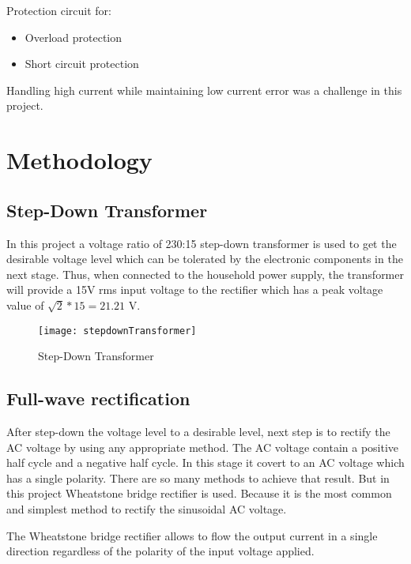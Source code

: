 \documentclass[11pt,a4paper]{article}
\begin{document}
\begin{multicols}{2}
\begin{flushleft}
Protection circuit for:
\end{flushleft}
\vspace{-0.35in}
\begin{itemize}
  \item Overload protection \vspace{-0.1in}
  \item Short circuit protection
\end{itemize}
Handling high current while maintaining low current error was a challenge in this project.

\vspace{0.5in}
\section{Methodology}
\subsection{Step-Down Transformer }
In this project a voltage ratio of 230:15 step-down transformer is used to get the desirable voltage level which can be tolerated by the electronic components in the next stage. Thus, when connected to the household power supply, the transformer will provide a 15V rms input voltage to the rectifier which has a peak voltage value of $\sqrt{2}*15 = 21.21$ V.
\begin{figure}[H]
    \centering
    \texttt{[image: stepdownTransformer]}
    \caption{Step-Down Transformer}
    \label{fig:Transformer}
\end{figure}

\subsection{Full-wave rectification }
After step-down the voltage level to a desirable level, next step is to rectify the AC voltage by using any appropriate method. The AC voltage contain a positive half cycle and a negative half cycle. In this stage it covert to an AC voltage which has a single polarity. There are so many methods to achieve that result. But in this project Wheatstone bridge rectifier is used. Because it is the most common and simplest method to rectify the sinusoidal AC voltage. 

The Wheatstone bridge rectifier allows to flow the output current in a single direction regardless of the polarity of the input voltage applied. \\


\end{multicols}
\end{document}
